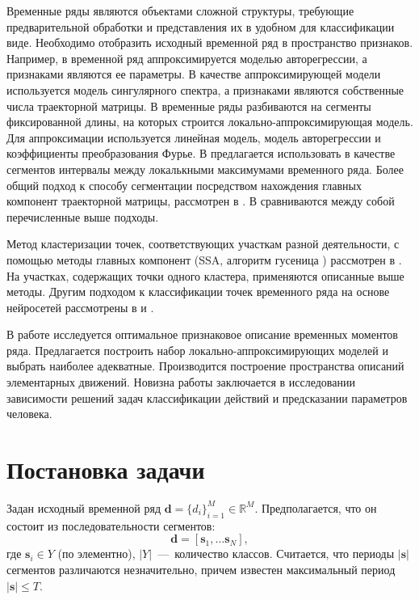 \documentclass[12pt, twoside]{article}
\begin{document}
Временные ряды являются объектами сложной структуры, требующие предварительной обработки и представления их в удобном для классификации виде. Необходимо отобразить исходный временной ряд в пространство признаков. Например, в \cite{Ivkin15} временной ряд аппроксимируется моделью авторегрессии, а признаками являются ее параметры. В качестве аппроксимирующей модели используется модель сингулярного спектра, а признаками являются собственные числа траекторной матрицы. В \cite{Karasikov16} временные ряды разбиваются на сегменты фиксированной длины, на которых строится локально-аппроксимирующая модель. Для аппроксимации используется линейная модель, модель авторегрессии и коэффициенты преобразования Фурье. В \cite{Anikeev18} предлагается использовать в качестве сегментов интервалы между локалькными максимумами временного ряда. Более общий подход к способу сегментации посредством нахождения главных компонент траекторной матрицы, рассмотрен в \cite{Motrenko16}. В \cite{Bochkarev18} сравниваются между собой перечисленные выше подходы.

Метод кластеризации точек, соответствующих участкам разной деятельности, с помощью методы главных компонент (SSA, алгоритм гусеница \cite{Danilov97}) рассмотрен в \cite{Grabovoy20}. На участках, содержащих точки одного кластера, применяются описанные выше методы. Другим подходом к классификации точек временного ряда на основе нейросетей рассмотрены в \cite{Dafne19} и \cite{Cinar18}.

В работе исследуется оптимальное признаковое описание временных моментов ряда. Предлагается построить набор локально-аппроксимирующих моделей и выбрать наиболее адекватные. Производится построение пространства описаний элементарных движений. Новизна работы заключается в исследовании зависимости решений задач классификации действий и предсказании параметров человека. 

\section{Постановка задачи}

Задан исходный временной ряд $\mathbf{d}=\{d_i\}_{i=1}^M\in \mathds{R}^M$. Предполагается, что он состоит из последовательности сегментов: 
\begin{equation}\label{eq0}
\mathbf{d}=[\mathbf{s}_1, \ldots \mathbf{s}_N],
\end{equation}
 где $\mathbf{s}_i\in Y$ (по элементно), $|Y|$~---~количество классов. Считается, что периоды $|\mathbf{s}|$ сегментов различаются незначительно, причем известен максимальный период $|\mathbf{s}|\leq T$.
\end{document}
